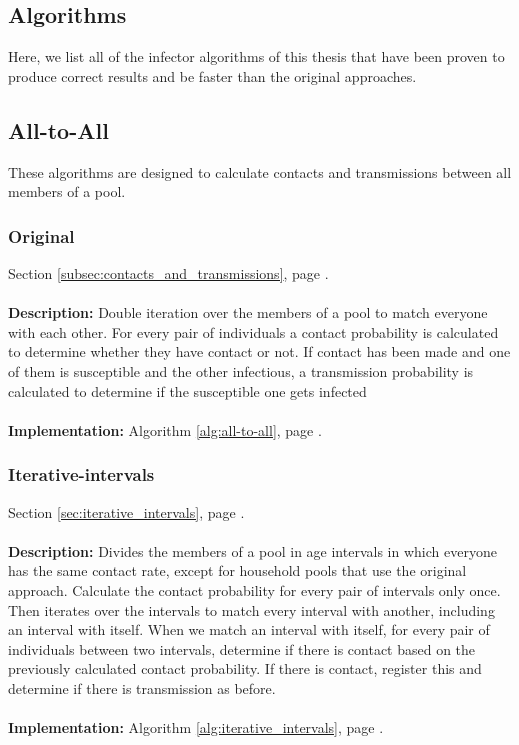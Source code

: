 \begin{appendices}

\chapter{Algorithms}
\label{appendix:algorithms}
Here, we list all of the infector algorithms of this thesis that have been proven to produce correct results and be faster than the original approaches.

\section{All-to-All}
These algorithms are designed to calculate contacts and transmissions between all members of a pool. 

\subsection{Original}
Section \ref{subsec:contacts_and_transmissions}, page \pageref{subsec:contacts_and_transmissions}.
\\\\
\textbf{Description:} Double iteration over the members of a pool to match everyone with each other. For every pair of individuals a contact probability is calculated to determine whether they have contact or not. If contact has been made and one of them is susceptible and the other infectious, a transmission probability is calculated to determine if the susceptible one gets infected
\\\\
\textbf{Implementation:} Algorithm \ref{alg:all-to-all}, page \pageref{alg:all-to-all}.

\subsection{Iterative-intervals}
Section \ref{sec:iterative_intervals}, page \pageref{sec:iterative_intervals}.
\\\\
\textbf{Description:} Divides the members of a pool in age intervals in which everyone has the same contact rate, except for household pools that use the original approach. Calculate the contact probability for every pair of intervals only once. Then iterates over the intervals to match every interval with another, including an interval with itself. When we match an interval with itself, for every pair of individuals between two intervals, determine if there is contact based on the previously calculated contact probability. If there is contact, register this and determine if there is transmission as before.
\\\\
\textbf{Implementation:} Algorithm \ref{alg:iterative_intervals}, page \pageref{alg:iterative_intervals}.


\end{appendices}
